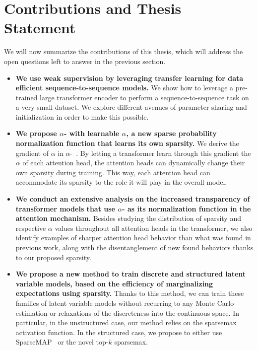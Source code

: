 \section{Contributions and Thesis Statement}
\label{sec:int_contributions}

We will now summarize the contributions of this thesis, which will
address the open questions left to answer in the previous section.

\begin{itemize}

      \item \textbf{We use weak supervision by leveraging transfer learning
                  for data efficient sequence-to-sequence models.}
            We show how to leverage a pre-trained large transformer
            encoder to perform a sequence-to-sequence task on a very
            small dataset. We explore different avenues of parameter
            sharing and initialization in order to make this
            possible.


      \item \textbf{We propose {\boldmath $\alpha$}-\entmaxtext{} with
                  learnable {\boldmath $\alpha$}, a new sparse probability
                  normalization function that learns its own sparsity.}
            We derive the gradient of $\alpha$ in
            $\alpha$-\entmaxtext{}~\citep{entmax}. By letting a
            transformer learn through this gradient the $\alpha$ of
            each attention head, the attention heads can dynamically
            change their own sparsity during training. This way, each
            attention head can accommodate its sparsity to the role
            it will play in the overall model.

      \item \textbf{We conduct an extensive analysis on the increased
                  transparency of transformer models that use {\boldmath
                              $\alpha$}-\entmaxtext{} as its normalization function in the
                  attention mechanism.}
            Besides studying the distribution of sparsity and respective $\alpha$ values
            throughout all attention heads in the transformer, we also identify
            examples of sharper attention head behavior than what was found in
            previous work, along with the disentanglement of new found behaviors
            thanks to our proposed sparsity.

      \item \textbf{We propose a new method to train discrete and
                  structured latent variable models, based on the
                  efficiency of marginalizing expectations using
                  sparsity.}
            Thanks to this method, we can train these families of
            latent variable models without recurring to any Monte Carlo
            estimation or relaxations of the discreteness into the
            continuous space. In particular, in the unstructured
            case, our method relies on the sparsemax activation
            function. In the structured case, we propose to either
            use SparseMAP~\citep{niculae2018sparsemap} or the
            novel top-$k$ sparsemax.


\end{itemize}
